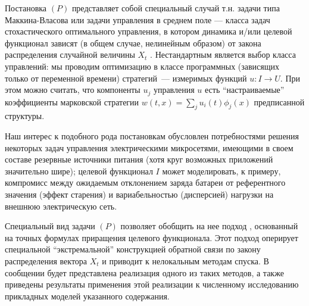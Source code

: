 Постановка $(P)$ представляет собой специальный случай т.н. задачи типа Маккина-Власова или задачи управления в среднем поле --- класса задач стохастического оптимального управления, в котором динамика и/или целевой функционал зависят (в общем случае, нелинейным образом) от закона распределения случайной величины $X_t$ \cite{1}. Нестандартным является выбор класса управлений: мы проводим оптимизацию в классе программных (зависящих только от переменной времени) стратегий~--- измеримых функций $u\colon I \to U$. При этом можно считать, что компоненты $u_j$ управления $u$ есть ``настраиваемые'' коэффициенты марковской стратегии $w(t, x) = \sum_j u_i(t) \phi_j(x)$ предписанной структуры.  

Наш интерес к подобного рода постановкам обусловлен потребностями решения некоторых задач управления электрическими микросетями, имеющими в своем составе резервные источники питания \cite{2} (хотя круг возможных приложений значительно шире); целевой функционал $I$ может моделировать, к примеру, компромисс между ожидаемым отклонением заряда батареи от референтного значения (эффект старения) и вариабельностью (дисперсией) нагрузки на внешнюю электрическую сеть.

Специальный вид задачи $(P)$ позволяет обобщить на нее подход \cite{3}, основанный на точных формулах приращения целевого функционала. Этот подход оперирует специальной ``экстремальной'' конструкцией обратной связи по закону распределения вектора $X_t$ и приводит к нелокальным методам спуска. В сообщении будет представлена реализация одного из таких методов, а также приведены результаты применения этой реализации к численному исследованию прикладных моделей указанного содержания.    




